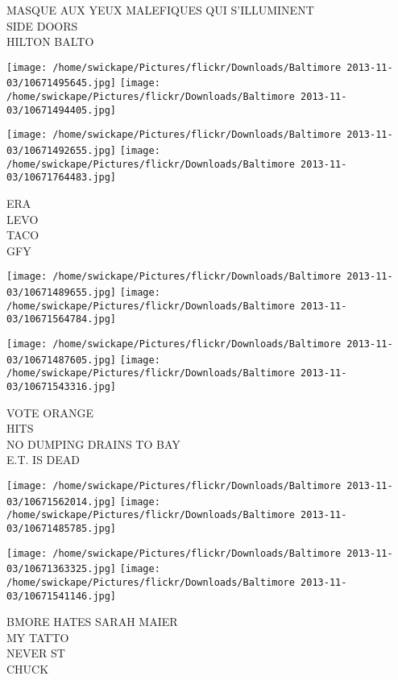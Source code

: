 \documentclass[10pt,letterpaper]{article}
\begin{document}
MASQUE AUX YEUX MALEFIQUES QUI S'ILLUMINENT\\
SIDE DOORS\\
HILTON BALTO\\
\pagebreak

\texttt{[image: /home/swickape/Pictures/flickr/Downloads/Baltimore 2013-11-03/10671495645.jpg]}
\texttt{[image: /home/swickape/Pictures/flickr/Downloads/Baltimore 2013-11-03/10671494405.jpg]}

\texttt{[image: /home/swickape/Pictures/flickr/Downloads/Baltimore 2013-11-03/10671492655.jpg]}
\texttt{[image: /home/swickape/Pictures/flickr/Downloads/Baltimore 2013-11-03/10671764483.jpg]}

ERA\\
LEVO\\
TACO\\
GFY\\
\pagebreak

\texttt{[image: /home/swickape/Pictures/flickr/Downloads/Baltimore 2013-11-03/10671489655.jpg]}
\texttt{[image: /home/swickape/Pictures/flickr/Downloads/Baltimore 2013-11-03/10671564784.jpg]}

\texttt{[image: /home/swickape/Pictures/flickr/Downloads/Baltimore 2013-11-03/10671487605.jpg]}
\texttt{[image: /home/swickape/Pictures/flickr/Downloads/Baltimore 2013-11-03/10671543316.jpg]}

VOTE ORANGE\\
HITS\\
NO DUMPING DRAINS TO BAY\\
E.T. IS DEAD\\
\pagebreak

\texttt{[image: /home/swickape/Pictures/flickr/Downloads/Baltimore 2013-11-03/10671562014.jpg]}
\texttt{[image: /home/swickape/Pictures/flickr/Downloads/Baltimore 2013-11-03/10671485785.jpg]}

\texttt{[image: /home/swickape/Pictures/flickr/Downloads/Baltimore 2013-11-03/10671363325.jpg]}
\texttt{[image: /home/swickape/Pictures/flickr/Downloads/Baltimore 2013-11-03/10671541146.jpg]}

BMORE HATES SARAH MAIER\\
MY TATTO\\
NEVER ST\\
CHUCK\\
\pagebreak
\end{document}
